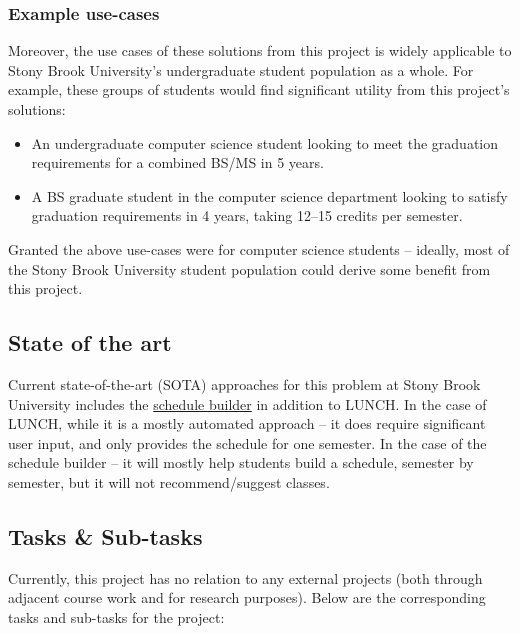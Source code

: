 \documentclass[12pt]{article}
\begin{document}
    \subsubsection{Example use-cases}
    \label{subsubsec:example}
    Moreover, the use cases of these solutions from this project is widely applicable to Stony Brook University's undergraduate student population as a whole. For example, these groups of students would find significant utility from this project's solutions:
    \begin{itemize}
        \item An undergraduate computer science student looking to meet the graduation requirements for a combined BS/MS in 5 years.
        \item A BS graduate student in the computer science department looking to satisfy graduation requirements in 4 years, taking 12--15 credits per semester.
    \end{itemize}

    Granted the above use-cases were for computer science students -- ideally, most of the Stony Brook University student population could derive some benefit from this project.

    \subsection{State of the art}
    \label{subsec:sota}
    Current state-of-the-art (SOTA) approaches for this problem at Stony Brook University includes the \href{https://you.stonybrook.edu/uaamedia/schedulebuilder/}{schedule builder} in addition to LUNCH\cite{lunch2023}. In the case of LUNCH, while it is a mostly automated approach -- it does require significant user input, and only provides the schedule for one semester. In the case of the schedule builder -- it will mostly help students build a schedule, semester by semester\cite{sched}, but it will not recommend/suggest classes.

    \subsection{Tasks \& Sub-tasks}
    \label{subsec:tasks}
    Currently, this project has no relation to any external projects (both through adjacent course work and for research purposes). Below are the corresponding tasks and sub-tasks for the project:
\end{document}

